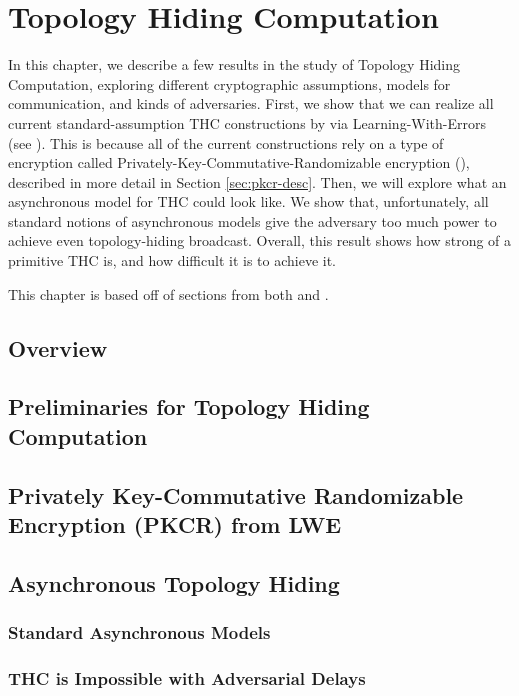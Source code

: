\chapter{Topology Hiding Computation}
In this chapter, we describe a few results in the study of Topology Hiding Computation, exploring different cryptographic assumptions, models for communication, and kinds of adversaries.
First, we show that we can realize all current standard-assumption THC constructions by via Learning-With-Errors (see \cite{C:Regev06}). This is because all of the current constructions rely on a type of encryption called Privately-Key-Commutative-Randomizable encryption (\PKCR), described in more detail in Section \ref{sec:pkcr-desc}.
Then, we will explore what an asynchronous model for THC could look like. We show that, unfortunately, all standard notions of asynchronous models give the adversary too much power to achieve even topology-hiding broadcast.
Overall, this result shows how strong of a primitive THC is, and how difficult it is to achieve it.

This chapter is based off of sections from both \cite{LLMMMT18} and \cite{LLMMMT20}.

\section{Overview}


\section{Preliminaries for Topology Hiding Computation}\label{sec:thc-prelim}


\section{Privately Key-Commutative Randomizable Encryption (PKCR) from LWE}
\label{sec:lwe-pkcr}

\section{Asynchronous Topology Hiding}

\subsection{Standard Asynchronous Models}

\subsection{THC is Impossible with Adversarial Delays}




